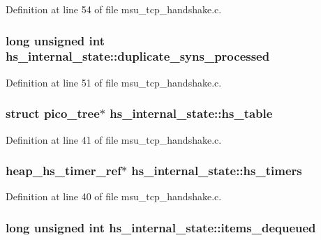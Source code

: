 Definition at line 54 of file msu\-\_\-tcp\-\_\-handshake.\-c.

\hypertarget{strucths__internal__state_a5c57148dddb7fbe07b770f7b28e03377}{
\subsubsection[{duplicate\-\_\-syns\-\_\-processed}]{\setlength{\rightskip}{0pt plus 5cm}long unsigned int hs\-\_\-internal\-\_\-state\-::duplicate\-\_\-syns\-\_\-processed}}\label{strucths__internal__state_a5c57148dddb7fbe07b770f7b28e03377}


Definition at line 51 of file msu\-\_\-tcp\-\_\-handshake.\-c.

\hypertarget{strucths__internal__state_a32b57cb261d476ccc282be6f7f3b3398}{
\subsubsection[{hs\-\_\-table}]{\setlength{\rightskip}{0pt plus 5cm}struct pico\-\_\-tree$\ast$ hs\-\_\-internal\-\_\-state\-::hs\-\_\-table}}\label{strucths__internal__state_a32b57cb261d476ccc282be6f7f3b3398}


Definition at line 41 of file msu\-\_\-tcp\-\_\-handshake.\-c.

\hypertarget{strucths__internal__state_a5d19061d7acad7124266f81bf5c7d98f}{
\subsubsection[{hs\-\_\-timers}]{\setlength{\rightskip}{0pt plus 5cm}heap\-\_\-hs\-\_\-timer\-\_\-ref$\ast$ hs\-\_\-internal\-\_\-state\-::hs\-\_\-timers}}\label{strucths__internal__state_a5d19061d7acad7124266f81bf5c7d98f}


Definition at line 40 of file msu\-\_\-tcp\-\_\-handshake.\-c.

\hypertarget{strucths__internal__state_a132da1299f254af535dd04d50593d21e}{
\subsubsection[{items\-\_\-dequeued}]{\setlength{\rightskip}{0pt plus 5cm}long unsigned int hs\-\_\-internal\-\_\-state\-::items\-\_\-dequeued}}\label{strucths__internal__state_a132da1299f254af535dd04d50593d21e}


